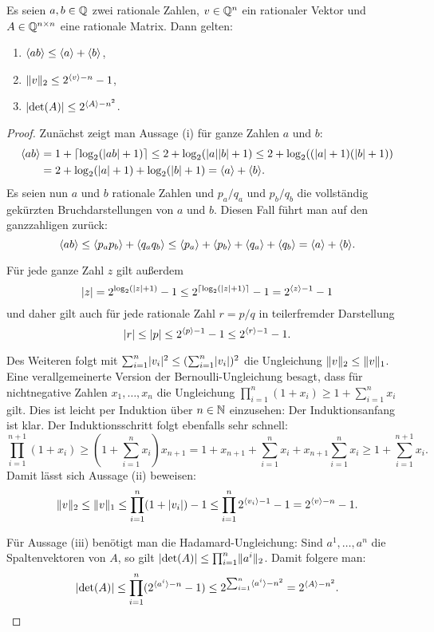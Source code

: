 \begin{proposition}\label{prop-rational-bounds-encoding}
	Es seien $a,b\in\mathbb{Q}$ zwei rationale Zahlen, $v\in \mathbb{Q}^n$ ein rationaler Vektor und $A\in\mathbb{Q}^{n\times n}$ eine rationale Matrix.
	Dann gelten:
	\begin{enumerate}[label=(\roman*)]
		\item $\langle ab\rangle \leq \langle a\rangle+\langle b\rangle$,
		\item $\lVert v\rVert_2 \leq 2^{\langle v\rangle - n} - 1$,
		\item $\lvert\det(A)\rvert \leq 2^{\langle A\rangle - n^2}$.
	\end{enumerate}
\end{proposition}
\begin{proof}
	Zunächst zeigt man Aussage (i) für ganze Zahlen $a$ und $b$:
	\begin{align*}
		\langle ab\rangle &= 1+\lceil \log_2(\lvert ab\rvert + 1) \rceil \leq 2+\log_2(\lvert a\rvert\lvert b\rvert+1) \leq 2+\log_2((\lvert a\rvert+1)(\lvert b\rvert+1))\\
		&=2+\log_2(\lvert a\rvert + 1) + \log_2(\lvert b\rvert + 1) = \langle a\rangle + \langle b\rangle.
	\end{align*}
	Es seien nun $a$ und $b$ rationale Zahlen und $p_a/q_a$ und $p_b/q_b$ die vollständig gekürzten Bruchdarstellungen von $a$ und $b$.
	Diesen Fall führt man auf den ganzzahligen zurück: \[
	\langle ab\rangle \leq \langle p_a p_b\rangle + \langle q_a q_b\rangle \leq \langle p_a\rangle+\langle p_b\rangle + \langle q_a\rangle + \langle q_b\rangle = \langle a\rangle + \langle b\rangle.\]
	
	Für jede ganze Zahl $z$ gilt außerdem 
	\[
	\lvert z\rvert = 2^{\log_2(\lvert z\rvert + 1)} - 1 \leq 2^{\lceil\log_2(\lvert z\rvert + 1)\rceil} - 1 = 2^{\langle z\rangle - 1} - 1
	\]
	und daher gilt auch für jede rationale Zahl $r = p/q$ in teilerfremder Darstellung
	\[
	\lvert r\rvert \leq \lvert p\rvert \leq 2^{\langle p\rangle -1} - 1 \leq 2^{\langle r\rangle - 1} -1.
	\]
	
	Des Weiteren folgt mit $\sum_{i=1}^n \lvert v_i\rvert^2 \leq (\sum_{i=1}^n \lvert v_i\rvert)^2$ die Ungleichung $\lVert v\rVert_2 \leq \lVert v\rVert_1$.
	Eine verallgemeinerte Version der Bernoulli-Ungleichung besagt, dass für nichtnegative Zahlen $x_1,\dots,x_n$ die Ungleichung $\prod_{i=1}^n (1+x_i) \geq 1 + \sum_{i=1}^n x_i$ gilt.
	Dies ist leicht per Induktion über $n\in\mathbb{N}$ einzusehen:
	Der Induktionsanfang ist klar.
	Der Induk\-tions\-schritt folgt ebenfalls sehr schnell:
	\[
	\prod_{i=1}^{n+1} (1+x_i) \geq (1 + \sum_{i=1}^n x_i) x_{n+1} = 1 + x_{n+1} + \sum_{i=1}^n x_i + x_{n+1} \sum_{i=1}^n x_i \geq 1 + \sum_{i=1}^{n+1} x_i.
	\]
	Damit lässt sich Aussage (ii) beweisen:
	\[
		\lVert v\rVert_2 \leq \lVert v\rVert_1 \leq \prod_{i=1}^{n} (1+\lvert v_i\rvert) - 1 \leq \prod_{i=1}^n 2^{\langle v_i\rangle - 1} - 1 = 2^{\langle v\rangle - n} - 1.
	\] 
	
	Für Aussage (iii) benötigt man die Hadamard-Ungleichung: Sind $a^1, \dots, a^n$ die Spaltenvektoren von $A$, so gilt $\lvert\det(A)\rvert \leq \prod_{i=1}^{n} \lVert a^i\rVert_2$.
	Damit folgere man:
	\setlength{\belowdisplayskip}{0em}
	\begin{align*}
		\lvert\det(A)\rvert \leq \prod_{i=1}^n (2^{\langle a^i\rangle - n} - 1) \leq 2^{\sum_{i=1}^n \langle a^i\rangle - n^2} = 2^{\langle A\rangle - n^2}.
	\end{align*}
\end{proof}

